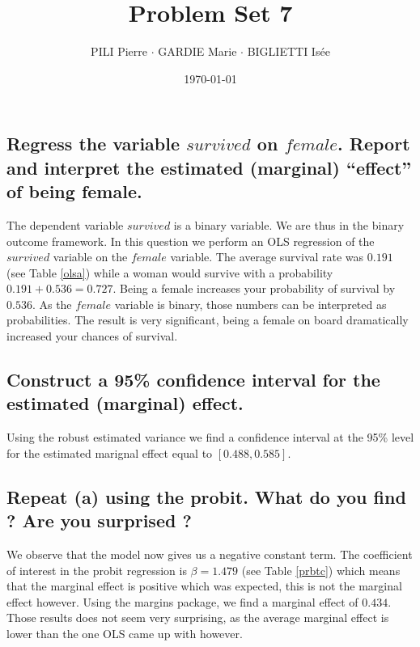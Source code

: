 \documentclass[12pt]{article}
\title{Problem Set 7}
\author{PILI Pierre $\cdot$ GARDIE Marie $\cdot$ BIGLIETTI Isée}
\date{\today}
\renewcommand{\thesubsection}{\arabic{section}.\arabic{subsection}}
\begin{document}
\maketitle
\renewcommand{\thesubsection}{\alph{subsection}}

\subsection{Regress the variable $survived$ on $female$. Report and interpret the estimated (marginal) “effect” of being female.}

The dependent variable $survived$ is a binary variable. We are thus in the binary outcome framework. In this question we perform an OLS regression of the $survived$
variable on the $female$ variable. The average survival rate was $0.191$ (see Table \ref{olsa}) while a woman would survive with a probability $0.191 + 0.536 = 0.727$.
Being a female increases your probability of survival by $0.536$. As the $female$ variable is binary, those numbers can be interpreted as probabilities. The result is very significant, being a female on board dramatically increased your chances of survival.

\subsection{Construct a 95\% confidence interval for the estimated (marginal) effect.}
Using the robust estimated variance we find a confidence interval at the 95\% level for the estimated marignal effect equal to $[0.488, 0.585]$.

\subsection{Repeat (a) using the probit. What do you find ? Are you surprised ?}

We observe that the model now gives us a negative constant term. The coefficient of interest in the probit regression is $\beta = 1.479$ (see Table \ref{prbtc}) which means that the marginal effect is positive which was expected, this is not the marginal effect however. Using the margins package, we find a marginal effect of $0.434$. Those results does not seem very surprising, as the average marginal effect is lower than the one OLS came up with however. 

\end{document}
